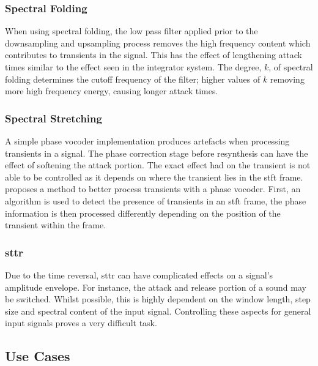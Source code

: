 		\subsubsection*{Spectral Folding}
			When using spectral folding, the low pass filter applied prior to the downsampling and upsampling
			process removes the high frequency content which contributes to transients in the signal. This has
			the effect of lengthening attack times similar to the effect seen in the integrator system. The
			degree, $k$, of spectral folding determines the cutoff frequency of the filter; higher values of
			$k$ removing more high frequency energy, causing longer attack times.

		\subsubsection*{Spectral Stretching}
			A simple phase vocoder implementation produces artefacts when processing transients in a signal.
			The phase correction stage before resynthesis can have the effect of softening the attack portion.
			The exact effect had on the transient is not able to be controlled as it depends on where the
			transient lies in the \acrshort{stft} frame. \citet{robel2003a} proposes a method to better process
			transients with a phase vocoder. First, an algorithm is used to detect the presence of transients
			in an \acrshort{stft} frame, the phase information is then processed differently depending on the
			position of the transient within the frame.

		\subsubsection*{\acrshort{sttr}}
			Due to the time reversal, \acrshort{sttr} can have complicated effects on a signal's amplitude
			envelope.  For instance, the attack and release portion of a sound may be switched. Whilst
			possible, this is highly dependent on the window length, step size and spectral content of the
			input signal. Controlling these aspects for general input signals proves a very difficult task.

	\subsection{Use Cases}
	\label{sec:ExcitationEvaluation-Comparison-UseCases}
